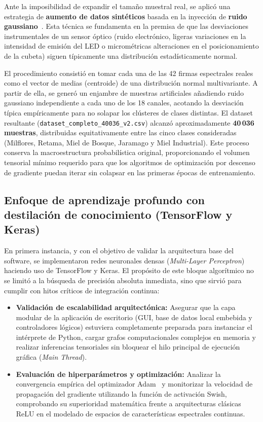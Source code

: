 Ante la imposibilidad de expandir el tamaño muestral real, se aplicó una estrategia de \textbf{aumento de datos sintéticos} basada en la inyección de \textbf{ruido gaussiano}~\cite{bjerrum:spectral}. Esta técnica se fundamenta en la premisa de que las desviaciones instrumentales de un sensor óptico (ruido electrónico, ligeras variaciones en la intensidad de emisión del LED o micrométricas alteraciones en el posicionamiento de la cubeta) siguen típicamente una distribución estadísticamente normal.

El procedimiento consistió en tomar cada una de las 42 firmas espectrales reales como el vector de medias (centroide) de una distribución normal multivariante. A partir de ella, se generó un enjambre de muestras artificiales añadiendo ruido gaussiano independiente a cada uno de los 18 canales, acotando la desviación típica empíricamente para no solapar los clústeres de clases distintas. El dataset resultante (\texttt{dataset\_completo\_40036\_v2.csv}) alcanzó aproximadamente \textbf{40\,036 muestras}, distribuidas equitativamente entre las cinco clases consideradas (Milflores, Retama, Miel de Bosque, Jaramago y Miel Industrial). Este proceso conserva la macroestructura probabilística original, proporcionando el volumen tensorial mínimo requerido para que los algoritmos de optimización por descenso de gradiente puedan iterar sin colapsar en las primeras épocas de entrenamiento.

\subsection*{Enfoque de aprendizaje profundo con destilación de conocimiento (TensorFlow y Keras)}

En primera instancia, y con el objetivo de validar la arquitectura base del software, se implementaron redes neuronales densas (\textit{Multi-Layer Perceptron}) haciendo uso de TensorFlow y Keras. El propósito de este bloque algorítmico no se limitó a la búsqueda de precisión absoluta inmediata, sino que sirvió para cumplir con hitos críticos de integración continua:

\begin{itemize}
    \item \textbf{Validación de escalabilidad arquitectónica:} Asegurar que la capa modular de la aplicación de escritorio (GUI, base de datos local embebida y controladores lógicos) estuviera completamente preparada para instanciar el intérprete de Python, cargar grafos computacionales complejos en memoria y realizar inferencias tensoriales sin bloquear el hilo principal de ejecución gráfica (\textit{Main Thread}).
    \item \textbf{Evaluación de hiperparámetros y optimización:} Analizar la convergencia empírica del optimizador Adam~\cite{kingma2015adam} y monitorizar la velocidad de propagación del gradiente utilizando la función de activación Swish, comprobando su superioridad matemática frente a arquitecturas clásicas ReLU en el modelado de espacios de características espectrales continuas.
\end{itemize}

